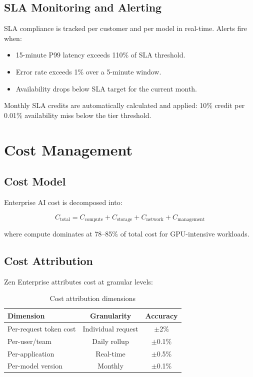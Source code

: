 \documentclass[11pt,a4paper]{article}
\begin{document}
\subsection{SLA Monitoring and Alerting}

SLA compliance is tracked per customer and per model in real-time. Alerts fire when:

\begin{itemize}
  \item 15-minute P99 latency exceeds 110\% of SLA threshold.
  \item Error rate exceeds 1\% over a 5-minute window.
  \item Availability drops below SLA target for the current month.
\end{itemize}

Monthly SLA credits are automatically calculated and applied: 10\% credit per 0.01\% availability miss below the tier threshold.

\section{Cost Management}

\subsection{Cost Model}

Enterprise AI cost is decomposed into:

\begin{equation}
C_{\text{total}} = C_{\text{compute}} + C_{\text{storage}} + C_{\text{network}} + C_{\text{management}}
\end{equation}

where compute dominates at 78--85\% of total cost for GPU-intensive workloads.

\subsection{Cost Attribution}

Zen Enterprise attributes cost at granular levels:

\begin{table}[H]
\centering
\caption{Cost attribution dimensions}
\label{tab:cost}
\begin{tabular}{lcc}
\toprule
Dimension & Granularity & Accuracy \\
\midrule
Per-request token cost & Individual request & $\pm$2\% \\
Per-user/team & Daily rollup & $\pm$0.1\% \\
Per-application & Real-time & $\pm$0.5\% \\
Per-model version & Monthly & $\pm$0.1\% \\
\bottomrule
\end{tabular}
\end{table}
\end{document}
